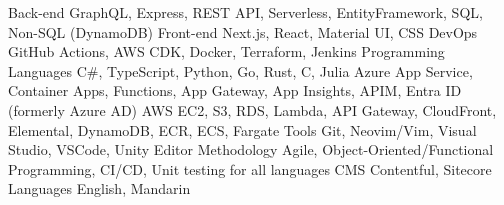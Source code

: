 \begin{cvskills}
  \cvskill
    {Back-end} %
    {GraphQL, Express, REST API, Serverless, EntityFramework, SQL, Non-SQL (DynamoDB)} %
  \cvskill
    {Front-end} %
    {Next.js, React, Material UI, CSS} %
  \cvskill
    {DevOps} %
    {GitHub Actions, AWS CDK, Docker, Terraform, Jenkins} %
  \cvskill
    {Programming Languages} %
    {C\#, TypeScript, Python, Go, Rust, C, Julia} %
  \cvskill
    {Azure} %
    {App Service, Container Apps, Functions, App Gateway, App Insights, APIM, Entra ID (formerly Azure AD)} %
  \cvskill
    {AWS} %
    {EC2, S3, RDS, Lambda, API Gateway, CloudFront, Elemental, DynamoDB, ECR, ECS, Fargate} %
  \cvskill
    {Tools} %
    {Git, Neovim/Vim, Visual Studio, VSCode, Unity Editor} %
  \cvskill
    {Methodology} %
    {Agile, Object-Oriented/Functional Programming, CI/CD, Unit testing for all languages} %
  \cvskill
    {CMS} %
    {Contentful, Sitecore} %
  \cvskill
    {Languages} %
    {English, Mandarin} %
\end{cvskills}
